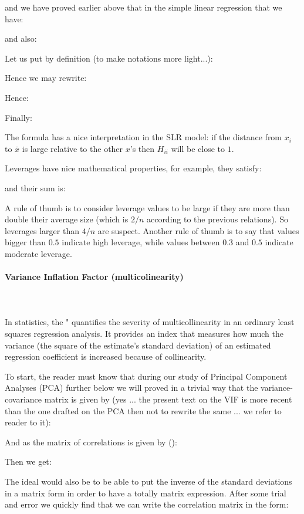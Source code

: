 	and we have proved earlier above that in the simple linear regression that we have:
	
	and also:
	
	Let us put by definition (to make notations more light...):
	
	Hence we may rewrite:
	
	Hence:
	
	Finally:
	
	The formula has a nice interpretation in the SLR model: if the distance from $x_i$ to $\bar{x}$ is large relative to the other $x$'s then $H_{ii}$ will be close to $1$.

	Leverages have nice mathematical properties, for example, they satisfy:
	
	and their sum is:
	
	A rule of thumb is to consider leverage values to be large if they are more than double their average size (which is $2/n$ according to the previous relations). So leverages larger than $4/n$ are suspect. Another rule of thumb is to say that values bigger than $0.5$ indicate high leverage, while values between $0.3$ and $0.5$ indicate moderate leverage.
	
	\paragraph{Variance Inflation Factor (multicolinearity)}\mbox{}\\\\
	In statistics, the " quantifies the severity of multicollinearity in an ordinary least squares regression analysis. It provides an index that measures how much the variance (the square of the estimate's standard deviation) of an estimated regression coefficient is increased because of collinearity.

	To start, the reader must know that during our study of Principal Component Analyses (PCA) further below we will proved in a trivial way that the variance-covariance matrix is given by (yes ... the present text on the VIF is more recent than the one drafted on the PCA then not to rewrite the same ... we refer to reader to it):
	
	And as the matrix of correlations is given by ():
	
	Then we get:
	
	The ideal would also be to be able to put the inverse of the standard deviations in a matrix form in order to have a totally matrix expression. After some trial and error we quickly find that we can write the correlation matrix in the form:
	
